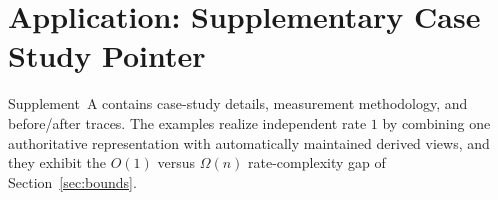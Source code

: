 \section{Application: Supplementary Case Study Pointer}\label{sec:empirical}

Supplement~A contains case-study details, measurement methodology, and before/after traces. The examples realize independent rate $1$ by combining one authoritative representation with automatically maintained derived views, and they exhibit the $O(1)$ versus $\Omega(n)$ rate-complexity gap of Section~\ref{sec:bounds}.

